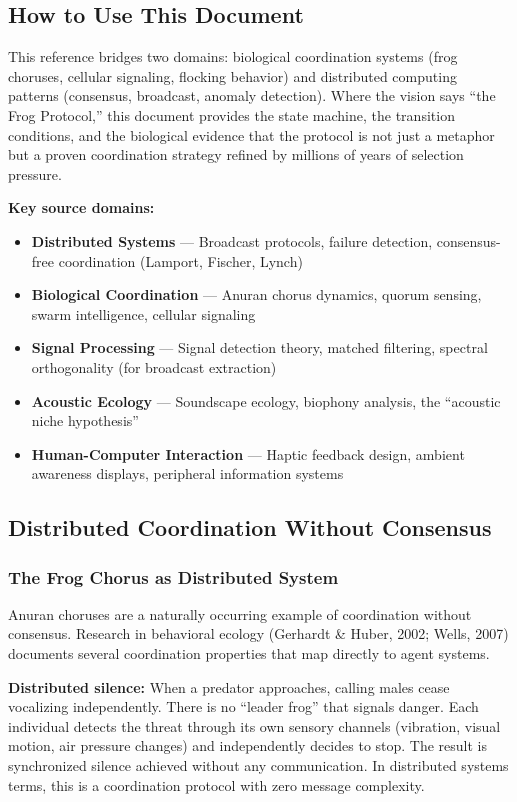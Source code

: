 \documentclass[11pt,letterpaper]{article}
\begin{document}
\subsection{How to Use This Document}

This reference bridges two domains: biological coordination systems (frog choruses, cellular signaling, flocking behavior) and distributed computing patterns (consensus, broadcast, anomaly detection). Where the vision says ``the Frog Protocol,'' this document provides the state machine, the transition conditions, and the biological evidence that the protocol is not just a metaphor but a proven coordination strategy refined by millions of years of selection pressure.

\textbf{Key source domains:}

\begin{itemize}[leftmargin=2em]
\item \textbf{Distributed Systems} --- Broadcast protocols, failure detection, consensus-free coordination (Lamport, Fischer, Lynch)
\item \textbf{Biological Coordination} --- Anuran chorus dynamics, quorum sensing, swarm intelligence, cellular signaling
\item \textbf{Signal Processing} --- Signal detection theory, matched filtering, spectral orthogonality (for broadcast extraction)
\item \textbf{Acoustic Ecology} --- Soundscape ecology, biophony analysis, the ``acoustic niche hypothesis''
\item \textbf{Human-Computer Interaction} --- Haptic feedback design, ambient awareness displays, peripheral information systems
\end{itemize}

\subsection{Distributed Coordination Without Consensus}

\subsubsection{The Frog Chorus as Distributed System}

Anuran choruses are a naturally occurring example of coordination without consensus. Research in behavioral ecology (Gerhardt \& Huber, 2002; Wells, 2007) documents several coordination properties that map directly to agent systems.

\textbf{Distributed silence:} When a predator approaches, calling males cease vocalizing independently. There is no ``leader frog'' that signals danger. Each individual detects the threat through its own sensory channels (vibration, visual motion, air pressure changes) and independently decides to stop. The result is synchronized silence achieved without any communication. In distributed systems terms, this is a coordination protocol with zero message complexity.
\end{document}
